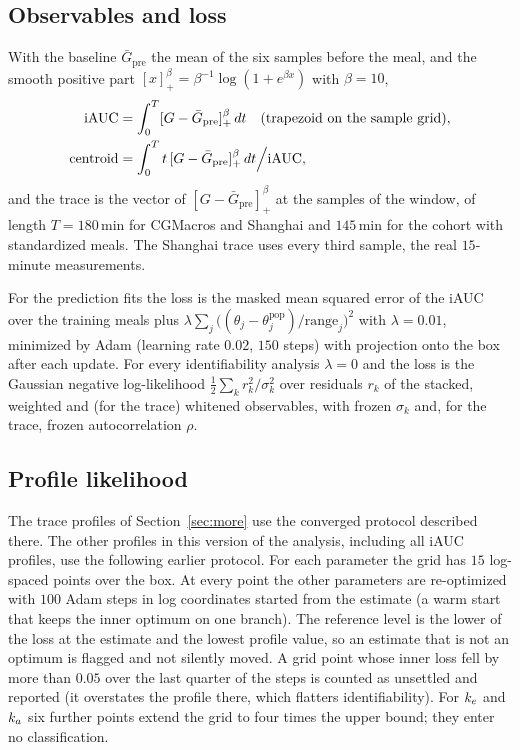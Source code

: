 \subsection{Observables and loss}

With the baseline $\bar G_{\mathrm{pre}}$ the mean of the six samples before the meal, and the smooth
positive part $[x]_+^{\beta}=\beta^{-1}\log(1+e^{\beta x})$ with $\beta=10$,
\begin{align}
\mathrm{iAUC}&=\int_{0}^{T}[G-\bar G_{\mathrm{pre}}]_+^{\beta}\,dt \quad (\text{trapezoid on the sample grid}),\\
\mathrm{centroid}&=\int_0^T t\,[G-\bar G_{\mathrm{pre}}]_+^{\beta}\,dt\Big/\mathrm{iAUC},
\end{align}
and the trace is the vector of $[G-\bar G_{\mathrm{pre}}]_+^{\beta}$ at the samples of the window, of
length $T=180$\,min for CGMacros and Shanghai and $145$\,min for the cohort with standardized meals. The
Shanghai trace uses every third sample, the real $15$-minute measurements.

For the prediction fits the loss is the masked mean squared error of the iAUC over the training meals plus
$\lambda\sum_j\bigl((\theta_j-\theta_j^{\mathrm{pop}})/\mathrm{range}_j\bigr)^2$ with $\lambda=0.01$,
minimized by Adam (learning rate $0.02$, $150$ steps) with projection onto the box after each update. For
every identifiability analysis $\lambda=0$ and the loss is the Gaussian negative log-likelihood
$\tfrac12\sum_k r_k^2/\sigma_k^2$ over residuals $r_k$ of the stacked, weighted and (for the trace) whitened
observables, with frozen $\sigma_k$ and, for the trace, frozen autocorrelation $\rho$.

\subsection{Profile likelihood}

The trace profiles of Section~\ref{sec:more} use the converged protocol described there. The other profiles in this
version of the analysis, including all iAUC profiles, use the following earlier protocol.
For each parameter the grid has $15$ log-spaced points over the box. At every point the other parameters
are re-optimized with $100$ Adam steps in log coordinates started from the estimate (a warm start that keeps
the inner optimum on one branch). The reference level is the lower of the loss at the estimate and the lowest
profile value, so an estimate that is not an optimum is flagged and not silently moved. A grid point whose
inner loss fell by more than $0.05$ over the last quarter of the steps is counted as unsettled and reported
(it overstates the profile there, which flatters identifiability). For $k_e$ and $k_a$ six further points
extend the grid to four times the upper bound; they enter no classification.

